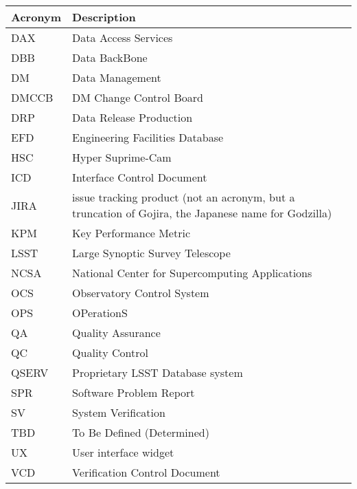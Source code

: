 \addtocounter{table}{-1}
\begin{longtable}{|l|p{}|}\hline 
\textbf{Acronym} & \textbf{Description}  \\\hline
DAX&Data Access Services \\\hline
DBB&Data BackBone \\\hline
DM&Data Management \\\hline
DMCCB&DM Change Control Board \\\hline
DRP&Data Release Production \\\hline
EFD&Engineering Facilities Database \\\hline
HSC&Hyper Suprime-Cam \\\hline
ICD&Interface Control Document \\\hline
JIRA&issue tracking product (not an acronym, but a truncation of Gojira, the Japanese name for Godzilla) \\\hline
KPM&Key Performance Metric \\\hline
LSST&Large Synoptic Survey Telescope \\\hline
NCSA&National Center for Supercomputing Applications \\\hline
OCS&Observatory Control System \\\hline
OPS&OPerationS \\\hline
QA&Quality Assurance \\\hline
QC&Quality Control \\\hline
QSERV&Proprietary LSST Database system \\\hline
SPR&Software Problem Report \\\hline
SV&System Verification \\\hline
TBD&To Be Defined (Determined) \\\hline
UX&User interface widget \\\hline
VCD&Verification Control Document \\\hline
\end{longtable} 

